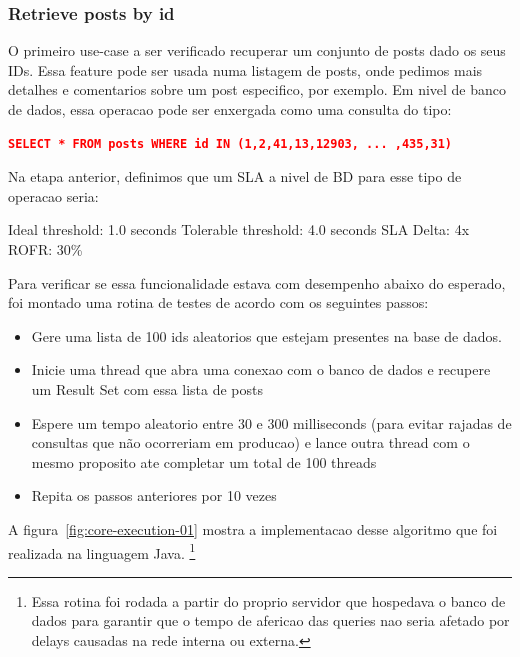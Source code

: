 \subsubsection{Retrieve posts by id}

O primeiro use-case a ser verificado recuperar um conjunto de posts dado os seus IDs. Essa feature pode ser usada numa listagem de posts, onde pedimos mais detalhes e comentarios sobre um post especifico, por exemplo. Em nivel de banco de dados, essa operacao pode ser enxergada como uma consulta do tipo: 

\begin{lstlisting}[language=json,firstnumber=1, caption=SQL Query - Retrieve posts by ids, label=retrieve_posts_by_ids_sql]
SELECT * FROM posts WHERE id IN (1,2,41,13,12903, ... ,435,31)
\end{lstlisting}\label{query01}

Na etapa anterior, definimos que um SLA a nivel de BD para esse tipo de operacao seria:  

Ideal threshold: 1.0 seconds
Tolerable threshold: 4.0 seconds
SLA Delta: 4x
ROFR: 30\%

Para verificar se essa funcionalidade estava com desempenho abaixo do esperado, foi montado uma rotina de testes de acordo com os seguintes passos: 

\begin{itemize}
\item{Gere uma lista de 100 ids aleatorios que estejam presentes na base de dados.} 
\item{Inicie uma thread que abra uma conexao com o banco de dados e recupere um Result Set com essa lista de posts}
\item{Espere um tempo aleatorio entre 30 e 300 milliseconds (para evitar rajadas de consultas que não ocorreriam em producao) e lance outra thread com o mesmo proposito ate completar um total de 100 threads}
\item{Repita os passos anteriores por 10 vezes}
\end{itemize}

A figura~\ref{fig:core-execution-01} mostra a implementacao desse algoritmo que foi realizada na linguagem Java. \footnote{Essa rotina foi rodada a partir do proprio servidor que hospedava o banco de dados para garantir que o tempo de afericao das queries nao seria afetado por delays causadas na rede interna ou externa.}


